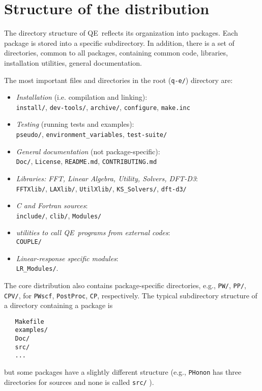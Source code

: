\documentclass[12pt,a4paper]{article}
\def\qe{QE}
\def\configure{\texttt{configure}}
\def\make.inc{\texttt{make.inc}}
\begin{document}
\section{Structure of the distribution}

The directory structure of \qe\ reflects its organization
into packages. Each package is stored into a specific subdirectory.
In addition, there is a set of directories, common to all packages,
containing common code,
libraries, installation utilities, general documentation.

The most important files and directories in the root (\texttt{q-e/})
directory are:
\begin{itemize}
\item {\em Installation} (i.e. compilation and linking):\\
\texttt{install/}, \texttt{dev-tools/}, \texttt{archive/},
\configure, \make.inc
\item  {\em Testing} (running tests and examples):\\
\texttt{pseudo/}, \texttt{environment\_variables}, \texttt{test-suite/}
\item  {\em General documentation} (not package-specific):\\
\texttt{Doc/}, \texttt{License}, \texttt{README.md}, \texttt{CONTRIBUTING.md}
\item {\em  Libraries: FFT, Linear Algebra, Utility, Solvers, DFT-D3}:\\
\texttt{FFTXlib/}, \texttt{LAXlib/}, \texttt{UtilXlib/},
		\texttt{KS\_Solvers/}, \texttt{dft-d3/}
\item {\em  C and Fortran sources}:\\
\texttt{include/}, \texttt{clib/}, \texttt{Modules/}
\item {\em utilities to call \qe\ programs from external codes}:\\
\texttt{COUPLE/}
\item {\em  Linear-response specific modules}:\\
\texttt{LR\_Modules/}.
\end{itemize}
The core distribution also contains package-specific directories,
e.g., \texttt{PW/}, \texttt{PP/}, \texttt{CPV/}, for
 \texttt{PWscf}, \texttt{PostProc}, \texttt{CP}, respectively.
 The typical subdirectory structure of a directory containing a package
 is
\begin{verbatim}
   Makefile
   examples/
   Doc/
   src/
   ...
\end{verbatim}
but some packages have a slightly different structure (e.g.,
\texttt{PHonon} has three directories for sources and none
is called \texttt{src/} ).
\end{document}
